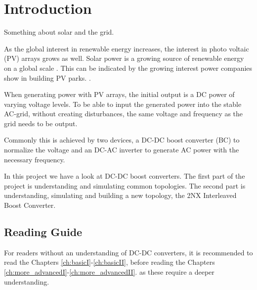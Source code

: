 \chapter{Introduction}\label{ch:introduction}
Something about solar and the grid.

As the global interest in renewable energy increases,
the interest in photo voltaic (PV) arrays grows as well. 
Solar power is a growing source of renewable energy on a global scale \cite{solglob}. 
This can be indicated by the growing interest power companies show in building PV parks. \cite{solpowcomp}. 

When generating power with PV arrays,
the initial output is a DC power of varying voltage levels. 
To be able to input the generated power into the stable AC-grid,
without creating disturbances,
the same voltage and frequency as the grid needs to be output. 

Commonly this is achieved by two devices,
a DC-DC boost converter (BC) to normalize the voltage
and an DC-AC inverter to generate AC power with the necessary frequency.

In this project we have a look at DC-DC boost converters.
The first part of the project is understanding and simulating common topologies.
The second part is understanding, simulating and building a new topology,
the 2NX Interleaved Boost Converter. 


\section*{Reading Guide}
For readers without an understanding of DC-DC converters,
it is recommended to read the Chapters \ref{ch:basicI}-\ref{ch:basicII}, 
before reading the Chapters \ref{ch:more_advancedI}-\ref{ch:more_advancedII}. 
as these require a deeper understanding.